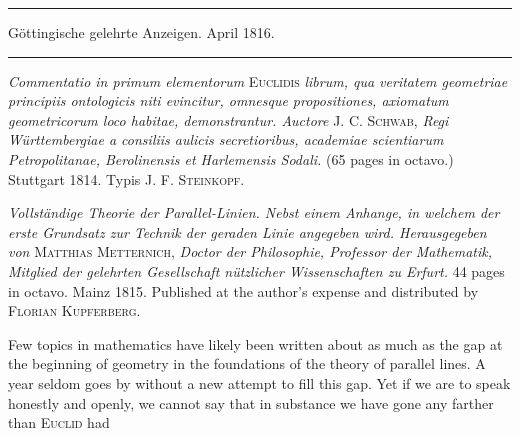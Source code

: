 \begin{center}
\rule{.85\textwidth}{.3pt}\par
Göttingische gelehrte Anzeigen. April 1816.\par
\rule{.85\textwidth}{.3pt}
\end{center}
\hspace*{\parindent}\textit{Commentatio in primum elementorum} \textsc{Euclidis} \textit{librum, qua veritatem geometriae principiis ontologicis niti evincitur, omnesque propositiones, axiomatum geometricorum loco habitae, demonstrantur. Auctore} \textsc{J. C. Schwab}, \textit{Regi Württembergiae a consiliis aulicis secretioribus, academiae scientiarum Petropolitanae, Berolinensis et Harlemensis Sodali.} (65 pages in octavo.) Stuttgart 1814. Typis \textsc{J. F. Steinkopf}.

\textit{Vollständige Theorie der Parallel-Linien. Nebst einem Anhange, in welchem der erste Grundsatz zur Technik der geraden Linie angegeben wird. Herausgegeben von} \textsc{Matthias Metternich}, \textit{Doctor der Philosophie, Professor der Mathematik, Mitglied der gelehrten Gesellschaft nützlicher Wissenschaften zu Erfurt.} 44 pages in octavo. Mainz 1815. Published at the author's expense and distributed by \textsc{Florian Kupferberg}.

Few topics in mathematics have likely been written about as much as the gap at the beginning of geometry in the foundations of the theory of parallel lines. A year seldom goes by without a new attempt to fill this gap. Yet if we are to speak honestly and openly, we cannot say that in substance we have gone any farther than \textsc{Euclid} had %
